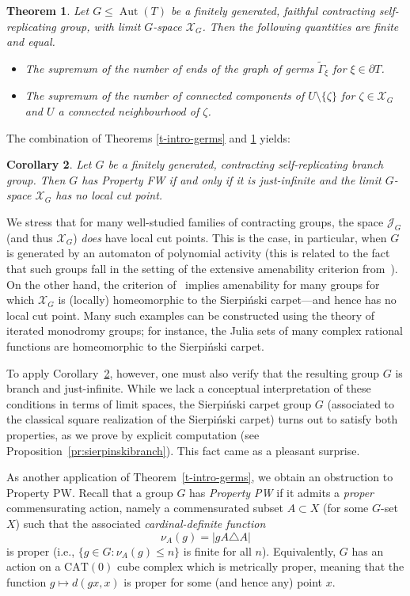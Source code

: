 \documentclass[11pt]{amsart}
\newcommand{\lims}[1][G]{\mathcal{J}_{#1}}
\newcommand{\limg}[1][G]{\mathcal{X}_{#1}}
\newcommand{\aut}{\ensuremath{\operatorname{Aut}}}%
\newcommand{\Gammatilde}{\ensuremath{\widetilde{\Gamma}}}%
\theoremstyle{definition}
\theoremstyle{plain}
\newtheorem{main thm}{Theorem}
\theoremstyle{remark}
\theoremstyle{plain}
\newtheorem{introthm}{Theorem}
\newtheorem{introcor}[introthm]{Corollary}
\begin{document}
\begin{introthm} \label{t-intro-cutpoints}
Let $G \leq \aut(T)$ be a finitely generated, faithful contracting self-replicating group, with limit $G$-space $\limg$. Then the following quantities are finite and equal.
\begin{itemize}
    \item The supremum of the number of ends of the graph of germs $\Gammatilde_\xi$ for $\xi\in \partial T$.

    \item The supremum of the number of connected components of $U\setminus \{\zeta\}$ for $\zeta\in \limg$ and $U$ a connected neighbourhood of $\zeta$.
\end{itemize}
\end{introthm}
The combination of Theorems \ref{t-intro-germs} and \ref{t-intro-cutpoints} yields:
\begin{introcor} \label{c-intro-FW}
Let $G$ be a finitely generated, contracting self-replicating branch group.  Then $G$ has Property FW if and only if it is just-infinite and the limit $G$-space $\limg$ has no local cut point.
\end{introcor}
We stress that for many well-studied families of contracting groups, the space $\lims$ (and thus $\limg$) \emph{does} have local cut points. This is the case, in particular, when $G$ is generated by an automaton of polynomial activity (this is related to the fact that such groups fall in the setting of the extensive amenability criterion from~\cite{JNS}). On the other hand, the criterion of~\cite{MNZ} implies amenability for many groups for which $\limg$ is (locally) homeomorphic to the Sierpi\'nski carpet---and hence has no local cut point. Many such examples can be constructed using the theory of iterated monodromy groups; for instance, the Julia sets of many complex rational functions are homeomorphic to the Sierpi\'nski carpet.

To apply Corollary~\ref{c-intro-FW}, however, one must also verify that the resulting group $G$ is branch and just-infinite. While we lack a conceptual interpretation of these conditions in terms of limit spaces, the Sierpi\'nski carpet group $G$ (associated to the classical square realization of the Sierpi\'nski carpet) turns out to satisfy both properties, as we prove by explicit computation (see Proposition~\ref{pr:sierpinskibranch}). This fact came as a pleasant surprise.


As another application of Theorem~\ref{t-intro-germs}, we obtain an obstruction to Property PW. Recall that a group $G$ has \emph{Property PW} if it admits a \emph{proper} commensurating action, namely a commensurated subset $A \subset X$ (for some $G$-set $X$) such that the associated \emph{cardinal-definite function}
\[\nu_A(g)= |gA \triangle A|\] is proper (i.e., $\{g\in G\colon \nu_A(g)\leq n
\}$ is finite for all $n$). Equivalently, $G$ has an action on a $\mathrm{CAT}(0)$ cube complex which is metrically proper, meaning that the function $g \mapsto d(gx, x)$ is proper for some (and hence any) point $x$.
\end{document}

